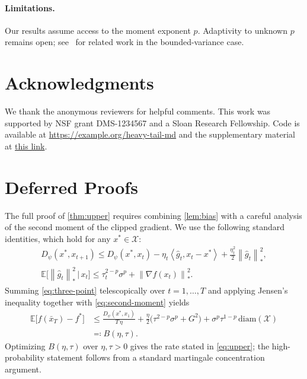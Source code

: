 \documentclass[11pt,a4paper]{article}
\theoremstyle{plain}
\theoremstyle{definition}
\theoremstyle{remark}
\newcommand{\E}{\mathbb{E}}
\newcommand{\norm}[1]{\left\lVert#1\right\rVert}
\newcommand{\inner}[2]{\left\langle#1,#2\right\rangle}
\begin{document}
\paragraph{Limitations.}
Our results assume access to the moment exponent $p$. Adaptivity to unknown
$p$ remains open; see~\citep{cutkosky2021highprob} for related work in the
bounded-variance case.

\section*{Acknowledgments}

We thank the anonymous reviewers for helpful comments. This work was supported
by NSF grant DMS-1234567 and a Sloan Research Fellowship. Code is available at
\url{https://example.org/heavy-tail-md} and the supplementary material at
\href{https://example.org/heavy-tail-md-supp}{this link}.

\appendix

\section{Deferred Proofs}
\label{app:proofs}

The full proof of \cref{thm:upper} requires combining \cref{lem:bias} with a
careful analysis of the second moment of the clipped gradient. We use the
following standard identities, which hold for any $x^* \in \mathcal{X}$:
\begin{gather}
    D_\psi(x^*, x_{t+1})
    \leq D_\psi(x^*, x_t)
        - \eta_t \inner{\hat g_t}{x_t - x^*}
        + \tfrac{\eta_t^2}{2} \norm{\hat g_t}_*^2,
        \label{eq:three-point} \\[2pt]
    \E\bigl[\norm{\hat g_t}_*^2 \,\big|\, x_t\bigr]
    \leq \tau_t^{2-p}\sigma^p + \norm{\nabla f(x_t)}_*^2.
        \label{eq:second-moment}
\end{gather}
Summing \eqref{eq:three-point} telescopically over $t = 1, \ldots, T$ and
applying Jensen's inequality together with \eqref{eq:second-moment} yields
\begin{align*}
    \E\bigl[f(\bar x_T) - f^*\bigr]
    &\leq \frac{D_\psi(x^*, x_1)}{T \, \eta}
        + \frac{\eta}{2} \bigl(\tau^{2-p}\sigma^p + G^2\bigr)
        + \sigma^p \tau^{1-p} \, \mathrm{diam}(\mathcal{X}) \\
    &\eqqcolon B(\eta, \tau).
\end{align*}
Optimizing $B(\eta, \tau)$ over $\eta, \tau > 0$ gives the rate stated in
\eqref{eq:upper}; the high-probability statement follows from a standard
martingale concentration argument.
\end{document}
